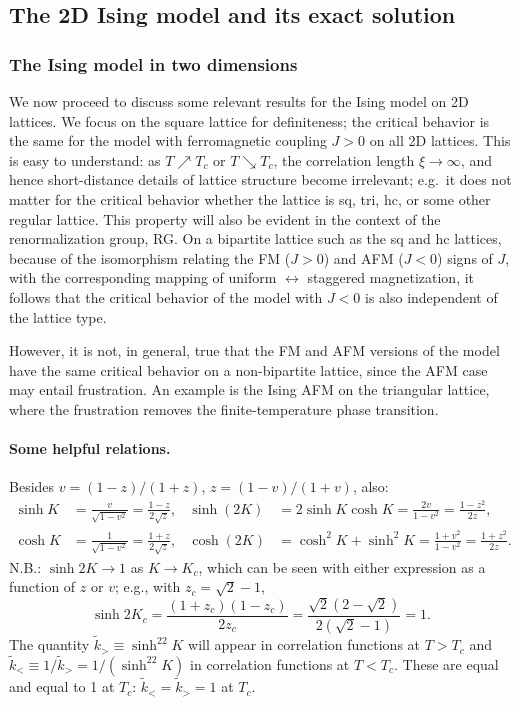 \subsection{The 2D Ising model and its exact solution}
\subsubsection*{The Ising model in two dimensions}

We now proceed to discuss some relevant results for the Ising model on 2D lattices. We focus on the
square lattice for definiteness; the critical behavior is the same for the model with ferromagnetic
coupling $J>0$ on all 2D lattices. This is easy to understand: as $T\nearrow T_c$ or $T\searrow T_c$,
the correlation length $\xi\to\infty$, and hence short-distance details of lattice structure become
irrelevant; e.g.\ it does not matter for the critical behavior whether the lattice is sq, tri, hc, or
some other regular lattice. This property will also be evident in the context of the renormalization
group, RG. On a bipartite lattice such as the sq and hc lattices, because of the isomorphism relating
the FM ($J>0$) and AFM ($J<0$) signs of $J$, with the corresponding mapping of uniform
$\leftrightarrow$ staggered magnetization, it follows that the critical behavior of the model with
$J<0$ is also independent of the lattice type.

However, it is not, in general, true that the FM and AFM versions of the model have the same critical
behavior on a non-bipartite lattice, since the AFM case may entail frustration. An example is the
Ising AFM on the triangular lattice, where the frustration removes the finite-temperature phase
transition.

\paragraph{Some helpful relations.}

Besides $v = (1-z)/(1+z)$, $z = (1-v)/(1+v)$, also:
\begin{align}
  \sinh K &= \frac{v}{\sqrt{1-v^2}} = \frac{1-z}{2\sqrt z}, &
  \sinh(2K) &= 2\sinh K\cosh K = \frac{2v}{1-v^2} = \frac{1-z^2}{2z},\\
  \cosh K &= \frac{1}{\sqrt{1-v^2}} = \frac{1+z}{2\sqrt z}, &
  \cosh(2K) &= \cosh^2K+\sinh^2K = \frac{1+v^2}{1-v^2} = \frac{1+z^2}{2z}.
\end{align}
N.B.: $\sinh 2K\to 1$ as $K\to K_c$, which can be seen with either expression as a function of $z$ or
$v$; e.g., with $z_c = \sqrt2-1$,
\begin{equation}
  \sinh 2K_c = \frac{(1+z_c)(1-z_c)}{2z_c} = \frac{\sqrt2(2-\sqrt2)}{2(\sqrt2-1)} = 1 .
\end{equation}
The quantity $\tilde k_>\equiv\sinh^22K$ will appear in correlation functions at $T>T_c$ and
$\tilde k_<\equiv1/\tilde k_> = 1/(\sinh^22K)$ in correlation functions at $T<T_c$. These
are equal and equal to 1 at $T_c$: $\tilde k_< = \tilde k_> = 1$ at $T_c$.


